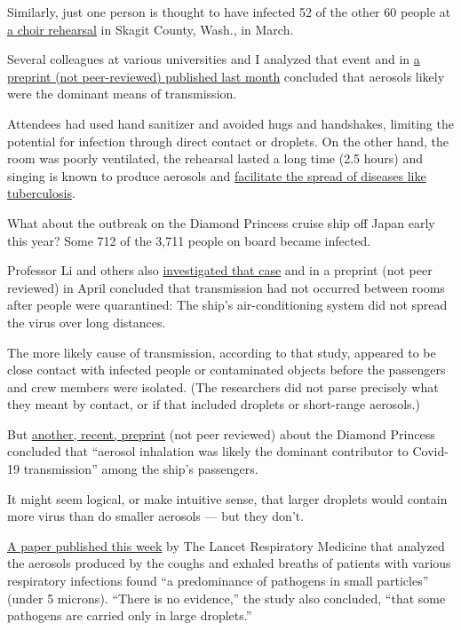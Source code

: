 Similarly, just one person is thought to have infected 52 of the other
60 people at
\href{https://www.nytimes.com/2020/05/12/health/coronavirus-choir.html}{a
choir rehearsal} in Skagit County, Wash., in March.

Several colleagues at various universities and I analyzed that event and
in
\href{https://www.medrxiv.org/content/10.1101/2020.06.15.20132027v2}{a
preprint (not peer-reviewed) published last month} concluded that
aerosols likely were the dominant means of transmission.

Attendees had used hand sanitizer and avoided hugs and handshakes,
limiting the potential for infection through direct contact or droplets.
On the other hand, the room was poorly ventilated, the rehearsal lasted
a long time (2.5 hours) and singing is known to produce aerosols and
\href{https://www.atsjournals.org/doi/abs/10.1164/arrd.1968.98.2.297}{facilitate
the spread of diseases like tuberculosis}.

What about the outbreak on the Diamond Princess cruise ship off Japan
early this year? Some 712 of the 3,711 people on board became infected.

Professor Li and others also
\href{https://www.medrxiv.org/content/10.1101/2020.04.09.20059113v1}{investigated
that case} and in a preprint (not peer reviewed) in April concluded that
transmission had not occurred between rooms after people were
quarantined: The ship's air-conditioning system did not spread the virus
over long distances.

The more likely cause of transmission, according to that study, appeared
to be close contact with infected people or contaminated objects before
the passengers and crew members were isolated. (The researchers did not
parse precisely what they meant by contact, or if that included droplets
or short-range aerosols.)

But
\href{https://www.medrxiv.org/content/10.1101/2020.07.13.20153049v1}{another,
recent, preprint} (not peer reviewed) about the Diamond Princess
concluded that ``aerosol inhalation was likely the dominant contributor
to Covid-19 transmission'' among the ship's passengers.

It might seem logical, or make intuitive sense, that larger droplets
would contain more virus than do smaller aerosols --- but they don't.

\href{https://www.thelancet.com/journals/lanres/article/PIIS2213-2600(20)30323-4/fulltext}{A
paper published this week} by The Lancet Respiratory Medicine that
analyzed the aerosols produced by the coughs and exhaled breaths of
patients with various respiratory infections found ``a predominance of
pathogens in small particles'' (under 5 microns). ``There is no
evidence,'' the study also concluded, ``that some pathogens are carried
only in large droplets.''

